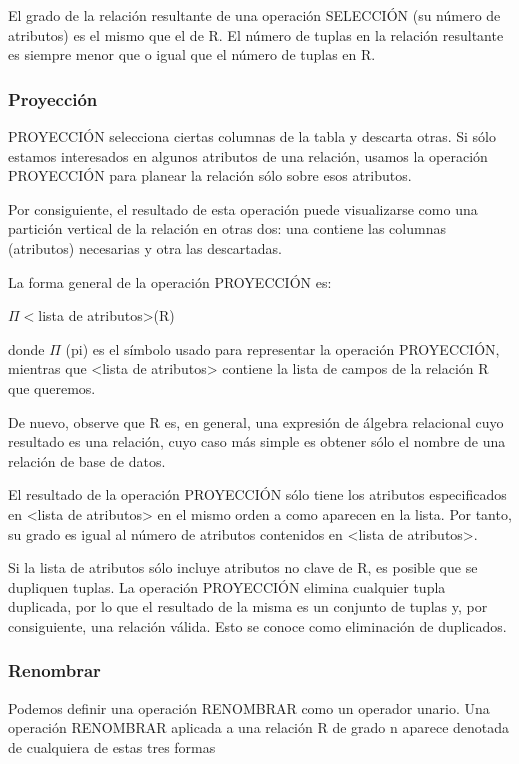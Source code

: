 El grado de la relación resultante de una operación SELECCIÓN (su número de atributos) es el mismo que el de R. El número de tuplas en la relación resultante es siempre menor que o igual que el número de tuplas en R.

\subsubsection*{Proyección}


PROYECCIÓN selecciona ciertas columnas de la tabla y descarta otras. Si sólo estamos interesados en algunos atributos de una relación, usamos la operación PROYECCIÓN para planear la relación sólo sobre esos atributos. 


Por consiguiente, el resultado de esta operación puede visualizarse como una partición vertical de la relación en otras dos: una contiene las columnas (atributos) necesarias y otra las descartadas. 

La forma general de la operación PROYECCIÓN es:


$\Pi<$lista de atributos>(R)


donde $\Pi$ (pi) es el símbolo usado para representar la operación PROYECCIÓN, mientras que <lista de atributos> contiene la lista de campos de la relación R que queremos. 


De nuevo, observe que R es, en general, una expresión de álgebra relacional cuyo resultado es una relación, cuyo caso más simple es obtener sólo el nombre de una relación de base de datos.


El resultado de la operación PROYECCIÓN sólo tiene los atributos especificados en <lista de atributos> en el mismo orden a como aparecen en la lista. Por tanto, su grado es igual al número de atributos contenidos en <lista de atributos>.


Si la lista de atributos sólo incluye atributos no clave de R, es posible que se dupliquen tuplas. La operación PROYECCIÓN elimina cualquier tupla duplicada, por lo que el resultado de la misma es un conjunto de tuplas y, por consiguiente, una relación válida. Esto se conoce como eliminación de duplicados.

\subsubsection*{Renombrar}

Podemos definir una operación RENOMBRAR como un operador unario. Una operación RENOMBRAR
aplicada a una relación R de grado n aparece denotada de cualquiera de estas tres formas


